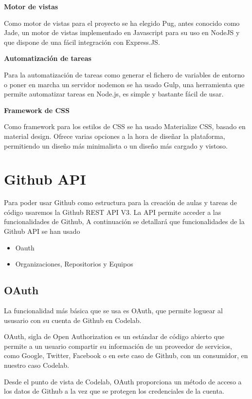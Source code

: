 {\bf Motor de vistas}

Como motor de vistas para el proyecto se ha elegido Pug, antes conocido como Jade, un motor de vistas implementado en Javascript para su uso en NodeJS y que dispone de una fácil integración con Express.JS. 

{\bf Automatización de tareas}

Para la automatización de tareas como generar el fichero de variables de entorno o poner en marcha un servidor nodemon se ha usado Gulp, una herramienta que permite automatizar tareas en Node.js, es simple y bastante fácil de usar.

{\bf Framework de CSS}

Como framework para los estilos de CSS se ha usado Materialize CSS, basado en material design. Ofrece varias opciones a la hora de diseñar la plataforma, permitiendo un diseño más minimalista o un diseño más cargado y vistoso.

\section{Github API}
\label{3:sec2}

Para poder usar Github como estructura para la creación de aulas y tareas de código usaremos la Github REST API V3.
La API permite acceder a las funcionalidades de Github, A continuación se detallará que funcionalidades de la Github API se han usado

\begin{itemize}
  \item Oauth
  \item Organizaciones, Repositorios y Equipos
\end{itemize}

\subsection{OAuth}
\label{3:2:1}

La funcionalidad más básica que se usa es OAuth, que permite loguear al ususario con su cuenta de Github en
Codelab.

OAuth, sigla de Open Authorization es un estándar de código abierto que permite a un usuario compartir su información de un proveedor de servicios, como Google, Twitter, Facebook o en este caso de Github, con un consumidor, en nuestro caso Codelab.

Desde el punto de vista de Codelab, OAuth proporciona un método de acceso a los datos de Github a la vez que se protegen los credenciales de la cuenta.

